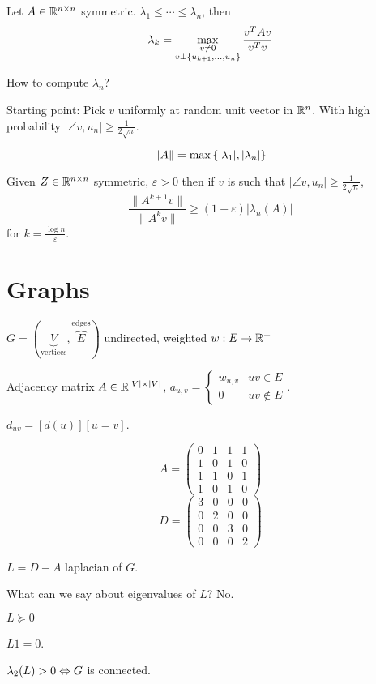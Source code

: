 \begin{theorem}
    Let $A \in \mathbb{R}^{n\times n}$ symmetric. $\lambda_1\leqslant \cdots\leqslant \lambda_n$, then
    \[
        \lambda_k = \max\limits_{\substack{v\neq 0\\ v\perp \left\{ u_{k+1},\ldots,u_n \right\}}} \frac{v^TAv}{v^Tv}
    \]
\end{theorem}

How to compute $\lambda_n$?

Starting point:
Pick $v$ uniformly  at random unit vector in $\mathbb{R}^n$. With high probability $\lvert \angle{v,u_n} \rvert \geqslant \frac{1}{2\sqrt{n}}$.

\[
    \lVert A \rVert = \max\left\{ \lvert \lambda_1 \rvert, \lvert \lambda_n \rvert \right\}
\]

\begin{theorem}
    Given $Z\in\mathbb{R}^{n\times n}$ symmetric, $\varepsilon > 0$ then if $v$ is such that $\lvert \angle{v,u_n} \rvert \geqslant \frac{1}{2\sqrt{n}}$,
    \[
        \frac{\lVert A^{k+1} v \rVert}{\lVert A^k v \rVert} \geqslant (1-\varepsilon) \lvert \lambda_n(A) \rvert
    \]
    for $k = \frac{\log n}{\varepsilon}$.
\end{theorem}

\section{Graphs}

$G = (\underbrace{V}_{\text{vertices}}, \overbrace{E}^{\text{edges}})$ undirected, weighted $w: E\to\mathbb{R}^+$

Adjacency matrix
$A \in \mathbb{R}^{\left\lvert V\right\rvert \times \left\lvert V\right\rvert}$, $a_{u,v} = \begin{cases}
    w_{u,v} & uv \in E\\
    0 & uv \not\in E
\end{cases}$.

$d_{uv} = [d(u)][u=v]$.
    
\begin{figure}[!ht]
    \centering
\end{figure}
\FloatBarrier
\[
    A = \left(
        \begin{matrix}
            0 & 1 & 1 & 1\\
            1 & 0 & 1 & 0\\
            1 & 1 & 0 & 1\\
            1 & 0 & 1 & 0
        \end{matrix}
    \right)
\]
\[
    D = \left(
        \begin{matrix}
            3 & 0 & 0 & 0\\
            0 & 2 & 0 & 0\\
            0 & 0 & 3 & 0\\
            0 & 0 & 0 & 2
        \end{matrix}
    \right)
\]

\begin{definition}
    $L = D - A$ laplacian of $G$.
\end{definition}

What can we say about eigenvalues of $L$? No.

$L \succcurlyeq 0$

$L 1 = 0$.

\begin{theorem}
    $\lambda_2(L) > 0 \Leftrightarrow G$ is connected.
\end{theorem}